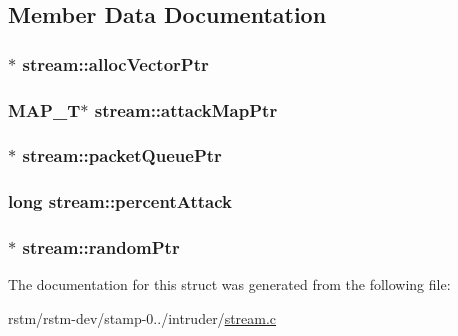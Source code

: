 \subsection{Member Data Documentation}
\hypertarget{structstream_af28ece56457c8c880ec9f93f4afcdab8}{
\subsubsection[{alloc\-Vector\-Ptr}]{$\ast$ stream\-::alloc\-Vector\-Ptr}}\label{structstream_af28ece56457c8c880ec9f93f4afcdab8}
\hypertarget{structstream_af86f8412d49b6ef0ddedb94773fb2bc9}{
\subsubsection[{attack\-Map\-Ptr}]{\setlength{\rightskip}{0pt plus 5cm}M\-A\-P\-\_\-\-T$\ast$ stream\-::attack\-Map\-Ptr}}\label{structstream_af86f8412d49b6ef0ddedb94773fb2bc9}
\hypertarget{structstream_a546cbbe55eafdb4fb3c3d46321064500}{
\subsubsection[{packet\-Queue\-Ptr}]{$\ast$ stream\-::packet\-Queue\-Ptr}}\label{structstream_a546cbbe55eafdb4fb3c3d46321064500}
\hypertarget{structstream_a7842c8d3613adca432a61130c3a6105c}{
\subsubsection[{percent\-Attack}]{\setlength{\rightskip}{0pt plus 5cm}long stream\-::percent\-Attack}}\label{structstream_a7842c8d3613adca432a61130c3a6105c}
\hypertarget{structstream_a0d612b10b3697fe9724c27b6ef7afb57}{
\subsubsection[{random\-Ptr}]{$\ast$ stream\-::random\-Ptr}}\label{structstream_a0d612b10b3697fe9724c27b6ef7afb57}


The documentation for this struct was generated from the following file\-:\begin{DoxyCompactItemize}
\item 
rstm/rstm-\/dev/stamp-\/0../intruder/\hyperlink{stream_8c}{stream.\-c}\end{DoxyCompactItemize}
